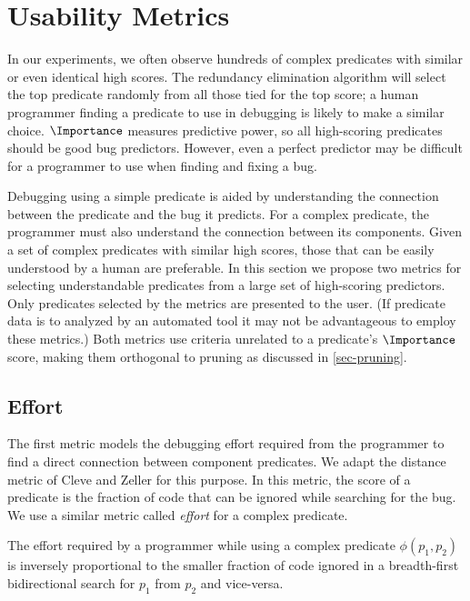 
\section{Usability Metrics}
\label{sec-metrics}
In our experiments, we often observe hundreds of complex predicates with similar or even identical high scores.  The redundancy elimination algorithm will select the top predicate randomly from all those tied for the top score; a human programmer finding a predicate to use in debugging is likely to make a similar choice.  $\Importance$ measures predictive power, so all high-scoring predicates should be good bug predictors.  However, even a perfect predictor may be difficult for a programmer to use when finding and fixing a bug.

Debugging using a simple predicate is aided by understanding the connection between the predicate and the bug it predicts.  For a complex predicate, the programmer must also understand the connection between its components.  Given a set of complex predicates with similar high scores, those that can be easily understood by a human are preferable.  In this section we propose two metrics for selecting understandable predicates from a large set of high-scoring predictors.  Only predicates selected by the metrics are presented to the user.  (If predicate data is to analyzed by an automated tool it may not be advantageous to employ these metrics.)  Both metrics use criteria unrelated to a predicate's $\Importance$ score, making them orthogonal to pruning as discussed in \autoref{sec-pruning}.

\subsection{Effort}

The first metric models the debugging effort required from the programmer to find a direct connection between component predicates.  We adapt the distance metric of Cleve and Zeller \cite{1062522} for this purpose.  In this metric, the score of a predicate is the fraction of code that can be ignored while searching for the bug.  We use a similar metric called \emph{effort} for a complex predicate.

\begin{defn}
\label{def-effort}
The effort required by a programmer while using a complex predicate $\phi(p_1, p_2)$ is inversely proportional to the smaller fraction of code ignored in a breadth-first bidirectional search for $p_1$ from $p_2$ and vice-versa.
\end{defn}

